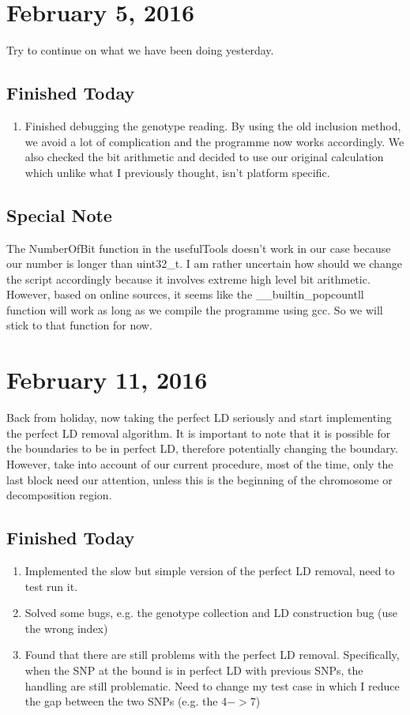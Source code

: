 \documentclass[12pt]{article}
\begin{document}
	\section{February 5, 2016}
	Try to continue on what we have been doing yesterday.
	\subsection{Finished Today}
	\begin{enumerate}
		\item 	Finished debugging the genotype reading.
				By using the old inclusion method, we avoid a lot of complication and the programme now works accordingly.
				We also checked the bit arithmetic and decided to use our original calculation which unlike what I previously thought, isn't platform specific.
				
	\end{enumerate}
	\subsection{Special Note}
	The NumberOfBit function in the usefulTools doesn't work in our case because our number is longer than uint32\_t. 
	I am rather uncertain how should we change the script accordingly because it involves extreme high level bit arithmetic.
	However, based on online sources, it seems like the \_\_builtin\_popcountll function will work as long as we compile the programme using gcc.
	So we will stick to that function for now.
	
	\section{February 11, 2016}
	Back from holiday, now taking the perfect LD seriously and start implementing the perfect LD removal algorithm.
	It is important to note that it is possible for the boundaries to be in perfect LD, therefore potentially changing the boundary.
	However, take into account of our current procedure, most of the time, only the last block need our attention, unless this is the beginning of the chromosome or decomposition region.
	\subsection{Finished Today}
	\begin{enumerate}
		\item Implemented the slow but simple version of the perfect LD removal, need to test run it.
		\item Solved some bugs, e.g. the genotype collection and LD construction bug (use the wrong index)
		\item Found that there are still problems with the perfect LD removal.
		Specifically, when the SNP at the bound is in perfect LD with previous SNPs, the handling are still problematic. 
		Need to change my test case in which I reduce the gap between the two SNPs (e.g. the 4$->$7)
	\end{enumerate}
\end{document}

